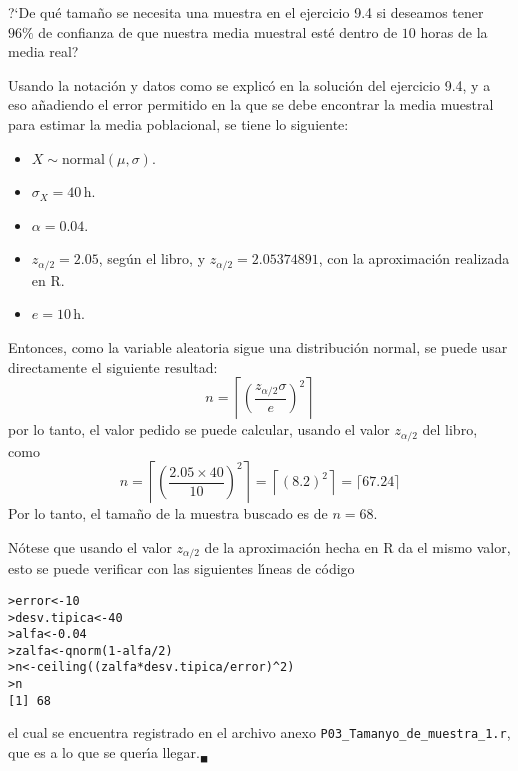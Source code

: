 \begin{enunciado}
 ?`De qu\'e tama\~no se necesita una muestra en el ejercicio 9.4 si deseamos tener $96\%$ de confianza de que nuestra media muestral est\'e dentro de $10$ horas de la media real?
\end{enunciado}

\begin{solucion}
 Usando la notaci\'on y datos como se explic\'o en la soluci\'on del ejercicio 9.4, y a eso a\~nadiendo el error permitido en la que se debe encontrar la media muestral para estimar la media poblacional, se tiene lo siguiente:
 \begin{itemize}
  \item $X\sim\text{normal}(\mu,\sigma)$.
  \item $\sigma_X = 40\,$h.
  \item $\alpha=0.04$.
  \item $z_{\alpha/2}=2.05$, seg\'un el libro, y $z_{\alpha/2}=2.05374891$, con la aproximaci\'on realizada en R. 
  \item $e=10\,$h.
 \end{itemize}
 Entonces, como la variable aleatoria sigue una distribuci\'on normal, se puede usar directamente el siguiente resultad:
 \begin{equation*}
  n = \left\lceil \left( \frac{z_{\alpha/2} \sigma}{e} \right)^2 \right\rceil
 \end{equation*}
 por lo tanto, el valor pedido se puede calcular, usando el valor $z_{\alpha/2}$ del libro, como
 \begin{equation*}
  n = \left\lceil \left( \frac{2.05\times 40}{10}\right)^2 \right\rceil = \left\lceil \left( 8.2 \right)^2 \right\rceil = \lceil 67.24 \rceil
 \end{equation*}
 Por lo tanto, el tama\~no de la muestra buscado es de $n=68$.
 \par 
 N\'otese que usando el valor $z_{\alpha/2}$ de la aproximaci\'on hecha en R da el mismo valor, esto se puede verificar con las siguientes l\'{\i}neas de c\'odigo
 \begin{verbatim}
>error<-10
>desv.tipica<-40
>alfa<-0.04
>zalfa<-qnorm(1-alfa/2)
>n<-ceiling((zalfa*desv.tipica/error)^2)
>n
[1] 68
 \end{verbatim}
 \vspace{-0.5cm}
 el cual se encuentra registrado en el archivo anexo \texttt{P03\_Tamanyo\_de\_muestra\_1.r}, que es a lo que se quer\'{\i}a llegar.${}_{\blacksquare}$
\end{solucion}

